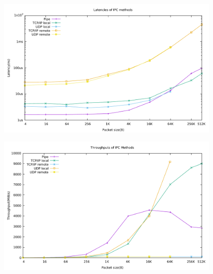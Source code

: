 \begin{figure}[!ht]
\includegraphics[width=.7\linewidth]{figures/latency}
\label{figure:latency}
\end{figure}

\begin{figure}[!ht]
    \includegraphics[width=.7\linewidth]{figures/throughput.pdf}
    \label{figure:throughput}
\end{figure}

